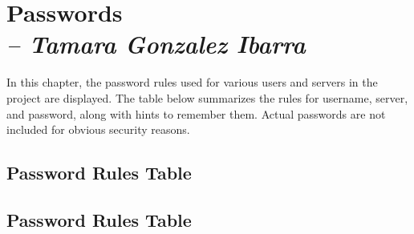\chapter{Passwords \\
\small{\textit{-- Tamara Gonzalez Ibarra}}
\label{Chapter::Passwords}}

In this chapter, the password rules used for various users and servers in the project are displayed. 
The table below summarizes the rules for username, server, and password, along with hints to remember them. Actual passwords are not included for obvious security reasons.

\section{Password Rules Table}

\section{Password Rules Table}

